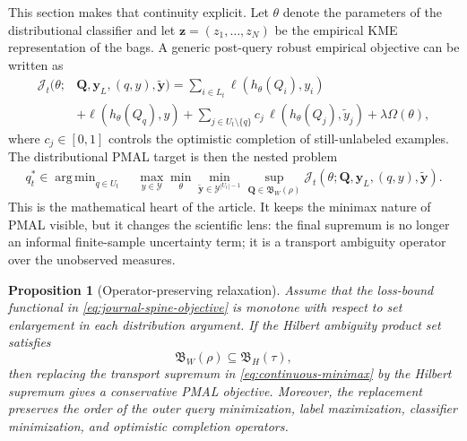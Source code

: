 \documentclass[10pt,journal]{IEEEtran}
\newtheorem{proposition}{Proposition}
\DeclareMathOperator*{\argmin}{arg\,min}
\newcommand{\Ycal}{\mathcal{Y}}
\newcommand{\Jcal}{\mathcal{J}}
\begin{document}
This section makes that continuity explicit. Let $\theta$ denote the parameters of the distributional classifier and let $\mathbf z=(z_1,\ldots,z_N)$ be the empirical KME representation of the bags. A generic post-query robust empirical objective can be written as
\begin{equation}
\label{eq:journal-spine-objective}
\begin{aligned}
\Jcal_t(\theta;&\mathbf Q,\mathbf y_L,(q,y),\tilde{\mathbf y})
=\sum_{i\in L_t}\ell(h_\theta(Q_i),y_i)\\
&+\ell(h_\theta(Q_q),y)
+\sum_{j\in U_t\setminus\{q\}} c_j\,
  \ell(h_\theta(Q_j),\tilde y_j)
+\lambda\Omega(\theta),
\end{aligned}
\end{equation}
where $c_j\in[0,1]$ controls the optimistic completion of still-unlabeled examples. The distributional PMAL target is then the nested problem
\begin{equation}
\label{eq:continuous-minimax}
\begin{aligned}
q_t^*\in\argmin_{q\in U_t}\;&
\max_{y\in\Ycal}
\min_{\theta}
\min_{\tilde{\mathbf y}\in\Ycal^{|U_t|-1}}
\sup_{\mathbf Q\in\mathfrak B_W(\rho)}
\Jcal_t(\theta;\mathbf Q,\mathbf y_L,(q,y),\tilde{\mathbf y}).
\end{aligned}
\end{equation}
This is the mathematical heart of the article. It keeps the minimax nature of PMAL visible, but it changes the scientific lens: the final supremum is no longer an informal finite-sample uncertainty term; it is a transport ambiguity operator over the unobserved measures.

\begin{proposition}[Operator-preserving relaxation]
\label{prop:operator-preserving-relaxation}
Assume that the loss-bound functional in \eqref{eq:journal-spine-objective} is monotone with respect to set enlargement in each distribution argument. If the Hilbert ambiguity product set satisfies
\begin{equation}
\label{eq:product-inclusion-spine}
\mathfrak B_W(\rho)\subseteq \mathfrak B_H(\tau),
\end{equation}
then replacing the transport supremum in \eqref{eq:continuous-minimax} by the Hilbert supremum gives a conservative PMAL objective. Moreover, the replacement preserves the order of the outer query minimization, label maximization, classifier minimization, and optimistic completion operators.
\end{proposition}
\end{document}
